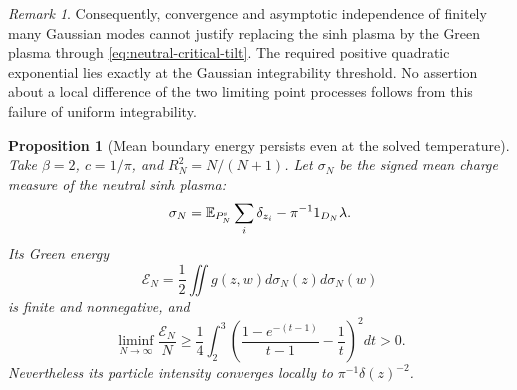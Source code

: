 \documentclass[11pt,a4paper]{article}
\numberwithin{equation}{section}
\newtheorem{proposition}[theorem]{Proposition}
\theoremstyle{definition}
\theoremstyle{remark}
\newtheorem{remark}[theorem]{Remark}
\begin{document}
\begin{remark}
Consequently, convergence and asymptotic independence of finitely many
Gaussian modes cannot justify replacing the sinh plasma by the Green
plasma through \eqref{eq:neutral-critical-tilt}.  The required positive
quadratic exponential lies exactly at the Gaussian integrability
threshold.  No assertion about a local difference of the two limiting
point processes follows from this failure of uniform integrability.
\end{remark}

\begin{proposition}[Mean boundary energy persists even at the solved temperature]
\label{prop:neutral-mean-boundary-energy}
Take $\beta=2$, $c=1/\pi$, and $R_N^2=N/(N+1)$.
Let $\sigma_N$ be the signed mean charge measure of the neutral sinh
plasma:
\[
 \sigma_N=\mathbb E_{P_N^{\rm s}}\sum_i\delta_{z_i}
             -\pi^{-1}1_{D_N}\lambda.
\]
Its Green energy
\[
 \mathcal E_N=\frac12\iint g(z,w)d\sigma_N(z)d\sigma_N(w)
\]
is finite and nonnegative, and
\begin{equation}
 \liminf_{N\to\infty}\frac{\mathcal E_N}{N}
 \ge\frac14\int_2^3
 \left(\frac{1-e^{-(t-1)}}{t-1}-\frac1t\right)^2dt>0.
 \label{eq:neutral-energy-lower-bound}
\end{equation}
Nevertheless its particle intensity converges locally to
$\pi^{-1}\delta(z)^{-2}$.
\end{proposition}
\end{document}
